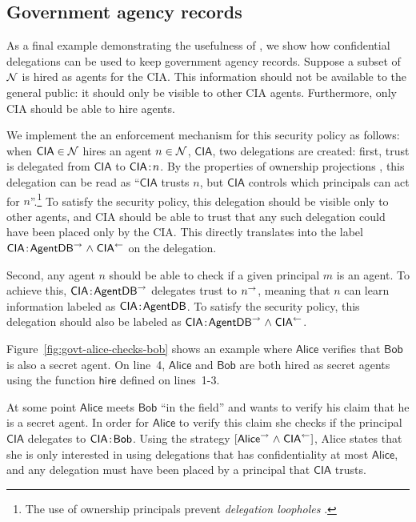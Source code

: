 \subsection{Government agency records}\label{subsec:agents}
As a final example demonstrating the usefulness of \lang, we show how confidential delegations can be used to keep government agency records. Suppose a subset of $\mathcal{N}$ is hired as agents for the CIA. 
This information should not be available to the general public: it should only be visible to other CIA agents. Furthermore, only CIA should be able to hire agents.

We implement the an enforcement mechanism for this security policy as follows: when $\mathsf{CIA} \in \mathcal{N}$ hires an agent $n \in \mathcal{N}$, $\mathsf{CIA}$, two delegations are created: first, trust is delegated from $\mathsf{CIA}$ to $\mathsf{CIA}\!:\!n$. By the properties of ownership projections \cite{Arden:2015:FA:2859845.2859998}, this delegation can be read as ``$\mathsf{CIA}$ trusts $n$, but $\mathsf{CIA}$ controls which principals can act for $n$''.\footnote{The use of ownership principals prevent \emph{delegation loopholes} \cite{Arden:2015:FA:2859845.2859998}.} To satisfy the security policy, this delegation should be visible only to other agents, and CIA should be able to trust that any such delegation could have been placed only by the CIA. This directly translates into the label $\mathsf{CIA}\!:\!\mathsf{AgentDB}^{\rightarrow} \mathrel{\land} \mathsf{CIA}^{\leftarrow}$ on the delegation.

Second, any agent $n$ should be able to check if a given principal $m$ is an agent. To achieve this, $\mathsf{CIA}\!:\!\mathsf{AgentDB}^{\rightarrow}$ delegates trust to $n^{\rightarrow}$, meaning that $n$ can learn information labeled as $\mathsf{CIA}\!:\!\mathsf{AgentDB}$. To satisfy the security policy, this delegation should also be labeled as $\mathsf{CIA}\!:\!\mathsf{AgentDB}^{\rightarrow} \mathrel{\land} \mathsf{CIA}^{\leftarrow}$.

Figure~\ref{fig:govt-alice-checks-bob} shows an example where $\mathsf{Alice}$ verifies that $\mathsf{Bob}$ is also a secret agent. On line~4, $\mathsf{Alice}$ and $\mathsf{Bob}$ are both hired as secret agents using the function $\mathsf{hire}$ defined on lines~1-3. 

At some point $\mathsf{Alice}$ meets $\mathsf{Bob}$ ``in the field'' and wants to verify his claim that he is a secret agent. In order for $\mathsf{Alice}$ to verify this claim she checks if the principal $\mathsf{CIA}$ delegates to $\mathsf{CIA}\!:\!\mathsf{Bob}$. Using the strategy $[\mathsf{Alice}^{\rightarrow} \mathrel{\land} \mathsf{CIA}^{\leftarrow}]$, Alice states that she is only interested in using delegations that has confidentiality at most $\mathsf{Alice}$, and any delegation must have been placed by a principal that $\mathsf{CIA}$ trusts.

